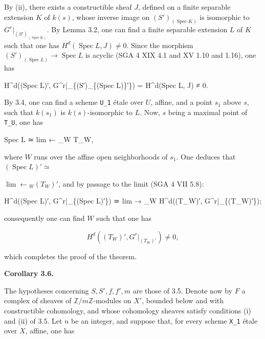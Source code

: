 \documentclass[
  11pt,
  a4paper,
]{book}
\newenvironment{Shaded}{}{}
\newcommand{\NormalTok}[1]{#1}
\begin{document}
By (ii), there exists a constructible sheaf \(J\), defined on a finite
separable extension \(K\) of \(k(s)\), whose inverse image on
\((S')_{(\operatorname{Spec} K)}\) is isomorphic to
\(G^{r}|_{(S')_{(\operatorname{Spec} K)}}\). By Lemma 3.2, one can find
a finite separable extension \(L\) of \(K\) such that one has
\(H^{d}(\operatorname{Spec} L, J) \neq 0\). Since the morphism
\((S')_{(\operatorname{Spec} L)} \to \operatorname{Spec} L\) is acyclic
(SGA 4 XIX 4.1 and XV 1.10 and 1.16), one has

\begin{Shaded}
\begin{Highlighting}[]
\NormalTok{H\^{}d((Spec L)′, G\^{}r|\_\{(S′)\_\{(Spec L)\}′\}) = H\^{}d(Spec L, J) ≠ 0.}
\end{Highlighting}
\end{Shaded}

By 3.4, one can find a scheme \texttt{U\_1} étale over \(U\), affine,
and a point \(s_{1}\) above \(s\), such that \(k(s_{1})\) is
\(k(s)\)-isomorphic to \(L\). Now, \(s\) being a maximal point of
\texttt{T\_U}, one has

\begin{Shaded}
\begin{Highlighting}[]
\NormalTok{Spec L ≃ lim ← \_W T\_W,}
\end{Highlighting}
\end{Shaded}

where \(W\) runs over the affine open neighborhoods of \(s_{1}\). One
deduces that \((\operatorname{Spec} L)' \simeq\)

\(\lim \leftarrow {}_{W} (T_{W})'\), and by passage to the limit (SGA 4
VII 5.8):

\begin{Shaded}
\begin{Highlighting}[]
\NormalTok{H\^{}d((Spec L)′, G\^{}r|\_\{(Spec L)′\}) ≃ lim → \_W H\^{}d((T\_W)′, G\^{}r|\_\{(T\_W)′\});}
\end{Highlighting}
\end{Shaded}

consequently one can find \(W\) such that one has

\[ H^{d}((T_{W})', G^{r}|_{(T_{W})'}) \neq 0, \]

which completes the proof of the theorem.

\textbf{Corollary 3.6.}

The hypotheses concerning \(S, S', f, f', m\) are those of 3.5. Denote
now by \(F\) a complex of sheaves of \(\mathbb{Z}/m\mathbb{Z}\)-modules
on \(X'\), bounded below and with constructible cohomology, and whose
cohomology sheaves satisfy conditions (i) and (ii) of 3.5. Let \(n\) be
an integer, and suppose that, for every scheme \texttt{X\_1} étale over
\(X\), affine, one has
\end{document}

